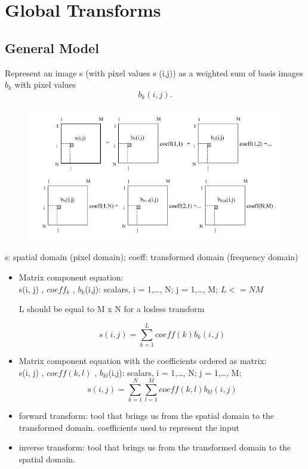 \documentclass{article}
\begin{document}
\section{Global Transforms}
\subsection{General Model}
Represent an image s (with pixel values s (i,j)) as a weighted sum of basis images $b_k$
 with pixel values \[b_k(i,j).\]
\begin{figure}[htp]
    \centering
\includegraphics[width=12cm]{images/1.png}
\end{figure}

s: spatial domain (pixel domain); coeff: transformed domain (frequency domain)
\begin{itemize}
\item Matrix component equation: \\
s(i, j) , $coeff_{k}$ , $b_{k}$(i,j): scalars, i = 1,…, N; j = 1,…, M; $L <= NM$

L should be equal to M x N for a losless transform

\begin{equation}
    s(i,j) = \sum_{k=1}^{L} coeff(k) b_k(i,j)
\end{equation}
\item Matrix component equation with the coefficients ordered as matrix: \\
s(i, j) , $coeff(k,l)$ , $b_{kl}$(i,j): scalars, i = 1,…, N; j = 1,…, M; 
\begin{equation}
    s(i,j) = \sum_{k=1}^{N}\sum_{l=1}^{M} coeff(k,l) b_{kl}(i,j)
\end{equation}
\end{itemize}

\begin{itemize}
    \item forward transform: tool that brings us from the spatial domain to the transformed domain.
    coefficients used to represent the input
    \item inverse transform: tool that brings us from the transformed domain to the spatial domain.
\end{itemize}
\pagebreak
\end{document}
